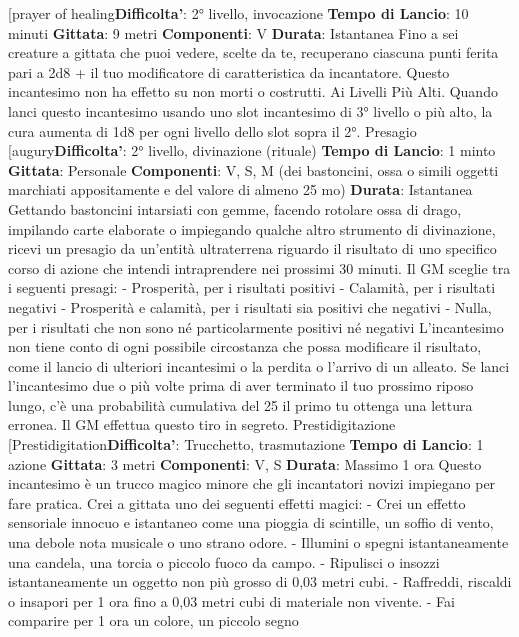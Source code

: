 \begin{multicols}{2}
[prayer of healing\textbf{Difficolta'}:
2° livello, invocazione
\textbf{Tempo di Lancio}: 10 minuti
\textbf{Gittata}: 9 metri
\textbf{Componenti}: V
\textbf{Durata}: Istantanea
Fino a sei creature a gittata che puoi vedere, scelte da
te, recuperano ciascuna punti ferita pari a 2d8 + il tuo
modificatore di caratteristica da incantatore. Questo
incantesimo non ha effetto su non morti o costrutti.
Ai Livelli Più Alti. Quando lanci questo incantesimo
usando uno slot incantesimo di 3° livello o più alto, la
cura aumenta di 1d8 per ogni livello dello slot sopra il
2°.
Presagio
[augury\textbf{Difficolta'}:
2° livello, divinazione (rituale)
\textbf{Tempo di Lancio}: 1 minto
\textbf{Gittata}: Personale
\textbf{Componenti}: V, S, M (dei bastoncini, ossa o simili
oggetti marchiati appositamente e del valore di almeno
25 mo)
\textbf{Durata}: Istantanea
Gettando bastoncini intarsiati con gemme, facendo
rotolare ossa di drago, impilando carte elaborate o
impiegando qualche altro strumento di divinazione,
ricevi un presagio da un’entità ultraterrena riguardo il
risultato di uno specifico corso di azione che intendi
intraprendere nei prossimi 30 minuti. Il GM sceglie tra i
seguenti presagi:
- Prosperità, per i risultati positivi
- Calamità, per i risultati negativi
- Prosperità e calamità, per i risultati sia positivi che
negativi
- Nulla, per i risultati che non sono né particolarmente
positivi né negativi
L’incantesimo non tiene conto di ogni possibile
circostanza che possa modificare il risultato, come il
lancio di ulteriori incantesimi o la perdita o l’arrivo di un
alleato.
Se lanci l’incantesimo due o più volte prima di aver
terminato il tuo prossimo riposo lungo, c’è una
probabilità cumulativa del 25%
il primo tu ottenga una lettura erronea. Il GM effettua
questo tiro in segreto.
Prestidigitazione
[Prestidigitation\textbf{Difficolta'}:
Trucchetto, trasmutazione
\textbf{Tempo di Lancio}: 1 azione
\textbf{Gittata}: 3 metri
\textbf{Componenti}: V, S
\textbf{Durata}: Massimo 1 ora
Questo incantesimo è un trucco magico minore che gli
incantatori novizi impiegano per fare pratica. Crei a
gittata uno dei seguenti effetti magici:
- Crei un effetto sensoriale innocuo e istantaneo
come una pioggia di scintille, un soffio di vento, una
debole nota musicale o uno strano odore.
- Illumini o spegni istantaneamente una candela, una
torcia o piccolo fuoco da campo.
- Ripulisci o insozzi istantaneamente un oggetto non
più grosso di 0,03 metri cubi.
- Raffreddi, riscaldi o insapori per 1 ora fino a 0,03
metri cubi di materiale non vivente.
- Fai comparire per 1 ora un colore, un piccolo segno

\end{multicols}
